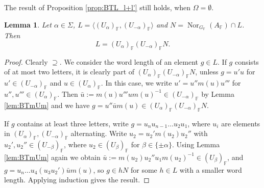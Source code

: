 \documentclass[12pt]{amsart}
\newcommand{\F}{\mathbb{F} }
\numberwithin{equation}{section}
\newtheorem{lemma}[theorem]{Lemma}
\theoremstyle{remark} %
\begin{document}
		The result of Proposition \ref{prop:BTL_l+l'} still holds, when $\Omega =\emptyset$.
		\begin{lemma}\label{lem:BTL_l+l'=-infty}
			Let $\alpha \in \Sigma$, $L = \langle (U_{\alpha})_\F , (U_{-\alpha})_\F \rangle$ and 
			$N = \operatorname{Nor}_{G_\F}(A_\F) \cap L$. Then
			$$
			L = (U_{\alpha})_\F(U_{-\alpha})_\F N.
			$$
		\end{lemma}
		\begin{proof}
			Clearly $\supseteq$. We consider the word length of an element $g \in L$. If $g$ consists of at most two letters, it is clearly part of $(U_{\alpha})_\F(U_{-\alpha})_\F N$, unless $g = u'u$ for $u'\in (U_{-\alpha})_\F$ and $u\in (U_\alpha)_\F$. In this case, we write $u' = u'' m(u) u'''$ for $u'',u''' \in (U_{\alpha})_\F$. Then $\bar{u} := m(u) u''' u m(u)^{-1} \in (U_{-\alpha})_\F$ by Lemma \ref{lem:BTmUm} and we have $g = u'' \bar{u} m(u) \in (U_{\alpha})_\F(U_{-\alpha})_\F N$.
			
			If $g$ contains at least three letters, write $g = u_n u_{n-1} \ldots u_{2} u_1$, where $u_i$ are elements in $(U_{\alpha})_\F, (U_{-\alpha})_\F$ alternating. Write $u_2 = u_2' m(u_2) u_2''$ with $u_2',u_2'' \in  (U_{-\beta})_\F$, where $u_2\in (U_{\beta})_\F$ for $\beta \in \{\pm \alpha\}$. Using Lemma \ref{lem:BTmUm} again we obtain $\bar{u} := m(u_2) u_2'' u_1 m(u_2)^{-1} \in (U_{\beta})_\F $, and
			$g = u_n \ldots u_4 (u_3 u_2') \bar{u} m(u)$, so $g \in h N $ for some $h \in L$ with a smaller word length. Applying induction gives the result.
		\end{proof}
		
\end{document}
